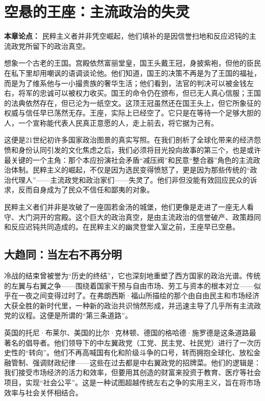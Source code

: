 \chapter{空悬的王座：主流政治的失灵}

\textbf{本章论点：} 民粹主义者并非凭空崛起，他们填补的是因信誉扫地和反应迟钝的主流政党所留下的政治真空。

想象一个古老的王国。宫殿依然富丽堂皇，国王头戴王冠，身披紫袍，但他的臣民在私下里却用嘲讽的语调谈论他。他们知道，国王的决策不再是为了王国的福祉，而是为了维系他与一小撮贵族的奢华生活；他们看到，法官的判决可以被金钱左右，将军的忠诚可以被权力收买。国王的命令仍在颁布，但已无人真心信服；王国的法典依然存在，但已沦为一纸空文。这顶王冠虽然还在国王头上，但它所象征的权威与信任早已荡然无存。王座，实际上已经空了。它只是在等待一个足够大胆的人，一个宣称能代表人民真正意愿的人，走上前去，将它据为己有。

这便是21世纪初许多国家政治图景的真实写照。在我们剖析了全球化带来的经济怨愤和身份认同引发的文化焦虑之后，我们必须将目光投向故事的第三个，也是或许最关键的一个主角：那个本应扮演社会矛盾“减压阀”和民意“整合器”角色的主流政治体制。民粹主义的崛起，不仅是因为选民变得愤怒了，更是因为那些传统的“政治代理人”——主流政党和政治家们——失灵了。他们非但没能有效回应民众的诉求，反而自身成为了民众不信任和鄙夷的对象。

民粹主义者们并非是攻破了一座固若金汤的城堡，他们更像是走进了一座无人看守、大门洞开的宫殿。这个巨大的政治真空，是由主流政治的信誉破产、政策趋同和反应迟钝共同造成的。在民粹主义的幽灵登堂入室之前，王座早已空悬。

\section{大趋同：当左右不再分明}

冷战的结束曾被誉为“历史的终结”，它也深刻地重塑了西方国家的政治光谱。传统的左翼与右翼之争——围绕着国家干预与自由市场、劳工与资本的根本对立——似乎在一夜之间变得过时了。在弗朗西斯·福山所描绘的那个由自由民主和市场经济大获全胜的新时代里，一种新的政治共识悄然形成，并迅速主导了几乎所有主流政党的议程。这便是所谓的“第三条道路”。

英国的托尼·布莱尔、美国的比尔·克林顿、德国的格哈德·施罗德是这条道路最著名的倡导者。他们领导下的中左翼政党（工党、民主党、社民党）进行了一次历史性的“转向”。他们不再高喊国有化和阶级斗争的口号，转而拥抱全球化、放松金融管制、强调财政纪律——这些在过去都是中右翼政党的招牌菜。他们的逻辑是：我们接受市场经济的活力和效率，但要用其创造的财富来投资于教育、医疗等社会项目，实现“社会公平”。这是一种试图超越传统左右之争的实用主义，旨在将市场效率与社会关怀相结合。

